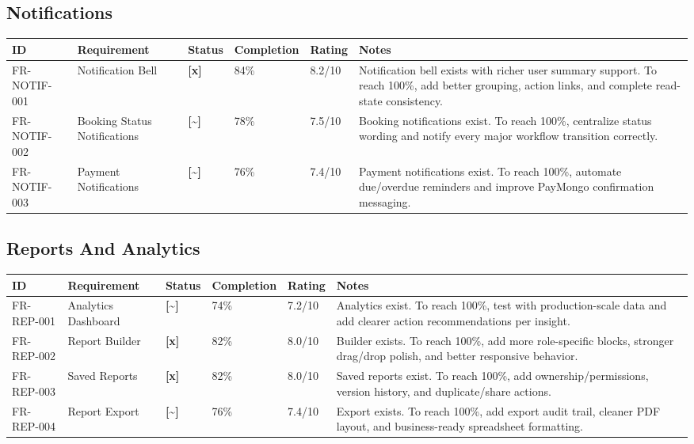 \documentclass[11pt,a4paper]{article}
\newcommand{\statusdone}{\textbf{[x]}}
\newcommand{\statuspartial}{\textbf{[{\textasciitilde}]}}
\begin{document}
\subsection{Notifications}

\begin{longtable}{L{0.15\textwidth} L{0.22\textwidth} C{0.08\textwidth} C{0.10\textwidth} C{0.10\textwidth} L{0.25\textwidth}}
\toprule
\textbf{ID} & \textbf{Requirement} & \textbf{Status} & \textbf{Completion} & \textbf{Rating} & \textbf{Notes} \\
\midrule
FR-NOTIF-001 & Notification Bell & \statusdone & 84\% & 8.2/10 & Notification bell exists with richer user summary support. To reach 100\%, add better grouping, action links, and complete read-state consistency. \\
FR-NOTIF-002 & Booking Status Notifications & \statuspartial & 78\% & 7.5/10 & Booking notifications exist. To reach 100\%, centralize status wording and notify every major workflow transition correctly. \\
FR-NOTIF-003 & Payment Notifications & \statuspartial & 76\% & 7.4/10 & Payment notifications exist. To reach 100\%, automate due/overdue reminders and improve PayMongo confirmation messaging. \\
\bottomrule
\end{longtable}

\subsection{Reports And Analytics}

\begin{longtable}{L{0.15\textwidth} L{0.22\textwidth} C{0.08\textwidth} C{0.10\textwidth} C{0.10\textwidth} L{0.25\textwidth}}
\toprule
\textbf{ID} & \textbf{Requirement} & \textbf{Status} & \textbf{Completion} & \textbf{Rating} & \textbf{Notes} \\
\midrule
FR-REP-001 & Analytics Dashboard & \statuspartial & 74\% & 7.2/10 & Analytics exist. To reach 100\%, test with production-scale data and add clearer action recommendations per insight. \\
FR-REP-002 & Report Builder & \statusdone & 82\% & 8.0/10 & Builder exists. To reach 100\%, add more role-specific blocks, stronger drag/drop polish, and better responsive behavior. \\
FR-REP-003 & Saved Reports & \statusdone & 82\% & 8.0/10 & Saved reports exist. To reach 100\%, add ownership/permissions, version history, and duplicate/share actions. \\
FR-REP-004 & Report Export & \statuspartial & 76\% & 7.4/10 & Export exists. To reach 100\%, add export audit trail, cleaner PDF layout, and business-ready spreadsheet formatting. \\
\bottomrule
\end{longtable}
\end{document}
